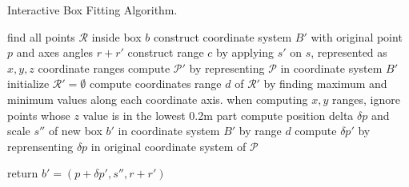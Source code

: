 \documentclass[letterpaper, 10 pt, conference]{ieeeconf}  %
\begin{document}
\begin{algorithm}
	\caption{Interactive Box Fitting Algorithm.}
	\label{alg:box-fitting}
	
	\SetAlgoLined
	\nl find all points $\mathcal{R}$ inside box $b$\;
	\nl construct coordinate system $B'$ with original point $p$ and axes angles $r+r'$\;
	\nl construct range $c$ by applying $s'$ on $s$, represented as $x,y,z$ coordinate ranges\;
	\nl compute $\mathcal{P'}$ by representing $\mathcal{P}$ in coordinate system $B'$\;
	\nl initialize $\mathcal{R'} = \emptyset$\;
	\nl compute coordinates range $d$ of $\mathcal{R'}$ by finding maximum and minimum values along each coordinate axis. when computing $x,y$ ranges, ignore points whose $z$ value is in the lowest 0.2m part\;
	\nl compute position delta $\delta p$ and scale $s''$ of new box $b'$ in coordinate system $B'$ by range $d$\;
	\nl compute $\delta p'$ by reprensenting $\delta p$ in original coordinate system of $\mathcal{P}$
	
	\nl return $b' = (p+\delta p', s'', r+r')$\;
	
\end{algorithm}
\end{document}
